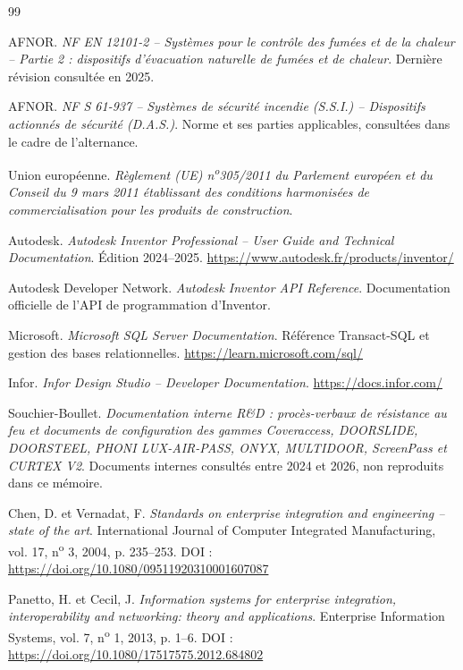{}
\renewcommand{\bibname}{Bibliographie}

\begin{thebibliography}{99}

AFNOR. \textit{NF EN 12101-2 -- Systèmes pour le contrôle des fumées et de la chaleur -- Partie 2 : dispositifs d'évacuation naturelle de fumées et de chaleur}. Dernière révision consultée en 2025.

AFNOR. \textit{NF S 61-937 -- Systèmes de sécurité incendie (S.S.I.) -- Dispositifs actionnés de sécurité (D.A.S.)}. Norme et ses parties applicables, consultées dans le cadre de l'alternance.

Union européenne. \textit{Règlement (UE) n\textsuperscript{o}305/2011 du Parlement européen et du Conseil du 9 mars 2011 établissant des conditions harmonisées de commercialisation pour les produits de construction}.

Autodesk. \textit{Autodesk Inventor Professional -- User Guide and Technical Documentation}. Édition 2024--2025. \url{https://www.autodesk.fr/products/inventor/}

Autodesk Developer Network. \textit{Autodesk Inventor API Reference}. Documentation officielle de l'API de programmation d'Inventor.

Microsoft. \textit{Microsoft SQL Server Documentation}. Référence Transact-SQL et gestion des bases relationnelles. \url{https://learn.microsoft.com/sql/}

Infor. \textit{Infor Design Studio -- Developer Documentation}. \url{https://docs.infor.com/}

Souchier-Boullet. \textit{Documentation interne R\&D : procès-verbaux de résistance au feu et documents de configuration des gammes Coveraccess, DOORSLIDE, DOORSTEEL, PHONI LUX-AIR-PASS, ONYX, MULTIDOOR, ScreenPass et CURTEX V2}. Documents internes consultés entre 2024 et 2026, non reproduits dans ce mémoire.

Chen, D. et Vernadat, F. \textit{Standards on enterprise integration and engineering -- state of the art}. International Journal of Computer Integrated Manufacturing, vol. 17, n\textsuperscript{o} 3, 2004, p. 235--253. DOI : \url{https://doi.org/10.1080/09511920310001607087}

Panetto, H. et Cecil, J. \textit{Information systems for enterprise integration, interoperability and networking: theory and applications}. Enterprise Information Systems, vol. 7, n\textsuperscript{o} 1, 2013, p. 1--6. DOI : \url{https://doi.org/10.1080/17517575.2012.684802}


\end{thebibliography}

